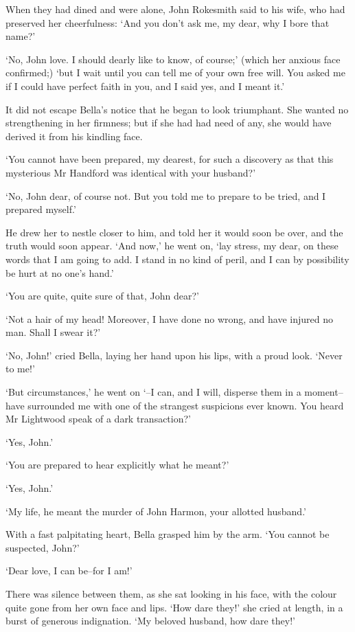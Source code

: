 When they had dined and were alone, John Rokesmith said to his wife, who
had preserved her cheerfulness: ‘And you don’t ask me, my dear, why I
bore that name?’

‘No, John love. I should dearly like to know, of course;’ (which her
anxious face confirmed;) ‘but I wait until you can tell me of your own
free will. You asked me if I could have perfect faith in you, and I said
yes, and I meant it.’

It did not escape Bella’s notice that he began to look triumphant. She
wanted no strengthening in her firmness; but if she had had need of any,
she would have derived it from his kindling face.

‘You cannot have been prepared, my dearest, for such a discovery as that
this mysterious Mr Handford was identical with your husband?’

‘No, John dear, of course not. But you told me to prepare to be tried,
and I prepared myself.’

He drew her to nestle closer to him, and told her it would soon be over,
and the truth would soon appear. ‘And now,’ he went on, ‘lay stress,
my dear, on these words that I am going to add. I stand in no kind of
peril, and I can by possibility be hurt at no one’s hand.’

‘You are quite, quite sure of that, John dear?’

‘Not a hair of my head! Moreover, I have done no wrong, and have injured
no man. Shall I swear it?’

‘No, John!’ cried Bella, laying her hand upon his lips, with a proud
look. ‘Never to me!’

‘But circumstances,’ he went on ‘--I can, and I will, disperse them in
a moment--have surrounded me with one of the strangest suspicions ever
known. You heard Mr Lightwood speak of a dark transaction?’

‘Yes, John.’

‘You are prepared to hear explicitly what he meant?’

‘Yes, John.’

‘My life, he meant the murder of John Harmon, your allotted husband.’

With a fast palpitating heart, Bella grasped him by the arm. ‘You cannot
be suspected, John?’

‘Dear love, I can be--for I am!’

There was silence between them, as she sat looking in his face, with the
colour quite gone from her own face and lips. ‘How dare they!’ she cried
at length, in a burst of generous indignation. ‘My beloved husband, how
dare they!’

